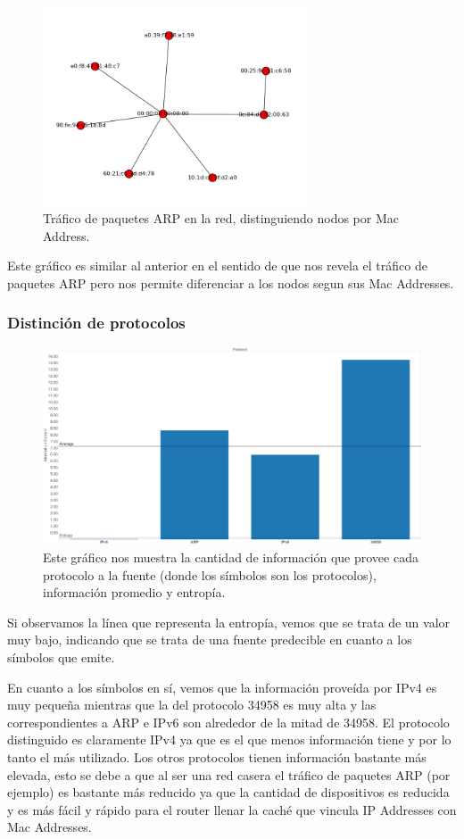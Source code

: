 \documentclass{article}
\theoremstyle{definition}
\theoremstyle{remark}
\begin{document}
\begin{figure}[H]
    \centering
    \includegraphics[width=0.70\textwidth]{../captures/CasaGerman/conn_mac.png}
    \caption{Tráfico de paquetes ARP en la red, distinguiendo nodos por Mac Address.}
    \label{fig:mesh1}
\end{figure}
Este gráfico es similar al anterior en el sentido de que nos revela el tráfico de paquetes ARP pero nos permite diferenciar a los nodos segun sus Mac Addresses.

\subsubsection{Distinción de protocolos}
\begin{figure}[H]
    \centering
    \includegraphics[width=1\textwidth]{../captures/CasaGerman/Protocol PDF Dashboard.png}
    \caption{Este gráfico nos muestra la cantidad de información que provee cada protocolo a la fuente (donde los símbolos son los protocolos), información promedio y entropía.}
    \label{fig:mesh1}
\end{figure}
Si observamos la línea que representa la entropía, vemos que se trata de un valor muy bajo, indicando que se trata de una fuente predecible en cuanto a los símbolos que emite.
\par En cuanto a los símbolos en sí, vemos que la información proveída por IPv4 es muy pequeña mientras que la del protocolo 34958 es muy alta y las correspondientes a ARP e IPv6 son alrededor de la mitad de 34958. El protocolo distinguido es claramente IPv4 ya que es el que menos información tiene y por lo tanto el más utilizado. Los otros protocolos tienen información bastante más elevada, esto se debe a que al ser una red casera el tráfico de paquetes ARP (por ejemplo) es bastante más reducido ya que la cantidad de dispositivos es reducida y es más fácil y rápido para el router llenar la caché que vincula IP Addresses con Mac Addresses.
\end{document}
